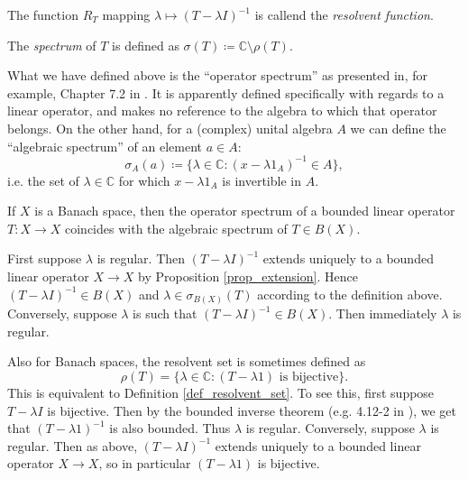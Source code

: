 \documentclass[12pt]{article}
\begin{document}
\begin{definition} %
	The function $R_T$ mapping $\lambda \mapsto (T-\lambda I)^{-1}$ is callend the \emph{resolvent function}.
\end{definition}

\begin{definition} %
\label{def_spectrum}
	The \emph{spectrum} of $T$ is defined as $\sigma(T) \coloneqq \mathbb{C} \setminus \rho(T)$. 
\end{definition}

\begin{remark}
\label{rmk_banach_space_spectrum_def_equivalent}
	What we have defined above is the ``operator spectrum'' as presented in, for example, Chapter 7.2 in \cite{kreyszig_1989}. It is apparently defined specifically with regards to a linear operator, and makes no reference to the algebra to which that operator belongs. On the other hand, for a (complex) unital algebra $A$ we can define the ``algebraic spectrum'' of an element $a\in A$:
	\begin{equation*}
		\sigma_A(a) \coloneqq \{\lambda\in\mathbb{C} : (x-\lambda 1_A)^{-1}\in A\},
	\end{equation*}
	i.e. the set of $\lambda\in\mathbb{C}$ for which $x-\lambda 1_A$ is invertible in $A$.

	If $X$ is a Banach space, then the operator spectrum of a bounded linear operator $T:X\to X$ coincides with the algebraic spectrum of $T\in B(X)$. 

	First suppose $\lambda$ is regular. Then $(T-\lambda I)^{-1}$ extends uniquely to a bounded linear operator $X\to X$ by Proposition \ref{prop_extension}. Hence $(T-\lambda I)^{-1}\in B(X)$ and $\lambda\in\sigma_{B(X)}(T)$ according to the definition above. Conversely, suppose $\lambda$ is such that $(T-\lambda I)^{-1}\in B(X)$. Then immediately $\lambda$ is regular.

	Also for Banach spaces, the resolvent set is sometimes defined as 
	\begin{equation*}
		\rho(T) = \{ \lambda\in\mathbb{C} : (T-\lambda 1) \text{ is bijective} \}.
	\end{equation*}
	This is equivalent to Definition \ref{def_resolvent_set}. To see this, first suppose $T-\lambda I$ is bijective. Then by the bounded inverse theorem (e.g. 4.12-2 in \cite{kreyszig_1989}), we get that $(T-\lambda 1)^{-1}$ is also bounded. Thus $\lambda$ is regular. Conversely, suppose $\lambda$ is regular. Then as above, $(T-\lambda I)^{-1}$ extends uniquely to a bounded linear operator $X\to X$, so in particular $(T-\lambda 1)$ is bijective.
\end{remark}
\end{document}
